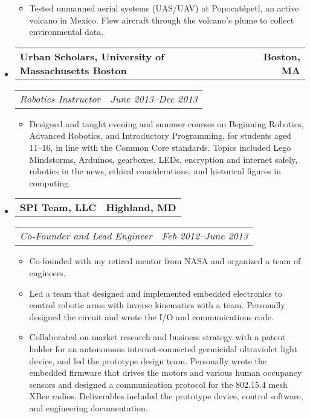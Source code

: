 \documentclass[10pt,letterpaper]{article}
\newcommand{\headerrow}[2]{%
    \begin{tabularx}{\linewidth}{Xr}
	    #1 & #2 \\
    \end{tabularx}
}
\begin{document}
\begin{itemize}
\begin{itemize}
        \item Tested unmanned aerial systems (UAS/UAV) at Popocatépetl, an active
            volcano in Mexico. Flew aircraft through the volcano's plume to
            collect environmental data.
    \end{itemize}

    \item
    \headerrow{\textbf{Urban Scholars, University of Massachusetts Boston}}
		{\textbf{Boston, MA}}
	\headerrow{\textit{Robotics Instructor}}{\textit{June 2013--Dec 2013}}
	\begin{itemize}
        \item Designed and taught evening and summer courses on Beginning
            Robotics, Advanced Robotics, and Introductory Programming, for
            students aged 11--16, in line with the Common Core standards.
            Topics included Lego Mindstorms, Arduinos, gearboxes, LEDs,
            encryption and internet safely, robotics in the news, ethical
            considerations, and historical figures in computing.
	\end{itemize}

	\item
	\headerrow{\textbf{SPI Team, LLC}}{\textbf{Highland, MD}}
	\headerrow{\textit{Co-Founder and Lead Engineer}}
		{\textit{Feb 2012--June 2013}}
	\begin{itemize}
        \item Co-founded with my retired mentor from NASA and organized a team
            of engineers.

        \item Led a team that designed and implemented embedded electronics to
            control robotic arms with inverse kinematics with a team.
            Personally designed the circuit and wrote the I/O and
            communications code.

        \item Collaborated on market research and business strategy with a
            patent holder for an autonomous internet-connected germicidal
            ultraviolet light device, and led the prototype design team.
            Personally wrote the embedded firmware that drives the motors and
            various human occupancy sensors and designed a communication
            protocol for the 802.15.4 mesh XBee radios.  Deliverables included
            the prototype device, control software, and engineering
            documentation.
	\end{itemize}


\end{itemize}
\end{document}
